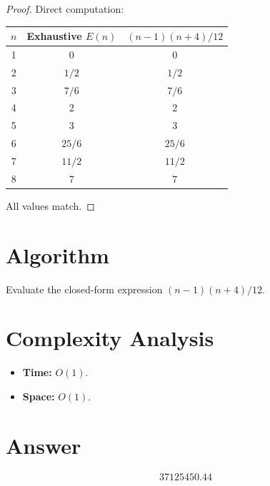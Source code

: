 \documentclass[11pt]{article}
\begin{document}
\begin{proof}
Direct computation:

\begin{center}
\begin{tabular}{ccc}
\toprule
$n$ & Exhaustive $E(n)$ & $(n-1)(n+4)/12$ \\
\midrule
1 & 0 & 0 \\
2 & $1/2$ & $1/2$ \\
3 & $7/6$ & $7/6$ \\
4 & 2 & 2 \\
5 & 3 & 3 \\
6 & $25/6$ & $25/6$ \\
7 & $11/2$ & $11/2$ \\
8 & 7 & 7 \\
\bottomrule
\end{tabular}
\end{center}

All values match.
\end{proof}

\section{Algorithm}

Evaluate the closed-form expression $(n-1)(n+4)/12$.

\section{Complexity Analysis}
\begin{itemize}
    \item \textbf{Time:} $O(1)$.
    \item \textbf{Space:} $O(1)$.
\end{itemize}

\section{Answer}

\[
\boxed{37125450.44}
\]
\end{document}
